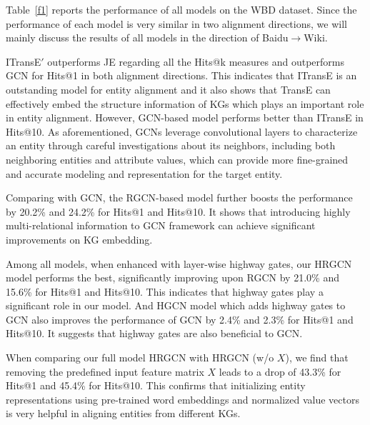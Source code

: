     Table~\ref{f1} reports the performance of all models on the WBD dataset. Since the performance of each model is very similar in two alignment directions, we will mainly discuss the results of all models in the direction of Baidu$\rightarrow$Wiki.

    ITransE$'$ outperforms JE regarding all the Hits@k measures and outperforms GCN for Hits@1 in both alignment directions. This indicates that ITransE is an
outstanding model for entity alignment and it also shows that TransE can effectively embed the structure information of KGs which plays an
important role in entity alignment. However, GCN-based model performs better than ITransE in Hits@10. As aforementioned, GCNs
leverage convolutional layers to characterize an entity through careful investigations about its neighbors, including both neighboring
entities and attribute values, which can provide more fine-grained and accurate modeling and representation for the target entity.


	Comparing with GCN, the RGCN-based model further boosts the performance by 20.2\% and 24.2\% for Hits@1 and Hits@10. It shows that introducing highly multi-relational information to GCN framework can achieve significant improvements on KG embedding.
	
	Among all models, when enhanced with layer-wise highway gates, our HRGCN model performs the best, significantly improving upon RGCN by 21.0\% and 15.6\% for Hits@1 and Hits@10. This indicates that highway gates play a significant role in our model. And HGCN model which adds highway gates to GCN also improves the performance of GCN by 2.4\% and 2.3\% for Hits@1 and Hits@10. It suggests that highway gates are also beneficial to GCN.
	
	When comparing our full model HRGCN with HRGCN (w/o $X$), we find that removing the predefined input feature matrix $X$ leads to a drop of 43.3\% for Hits@1 and 45.4\% for Hits@10. This confirms that initializing entity representations using pre-trained word embeddings and normalized value vectors is very helpful in aligning entities from different KGs.
	
